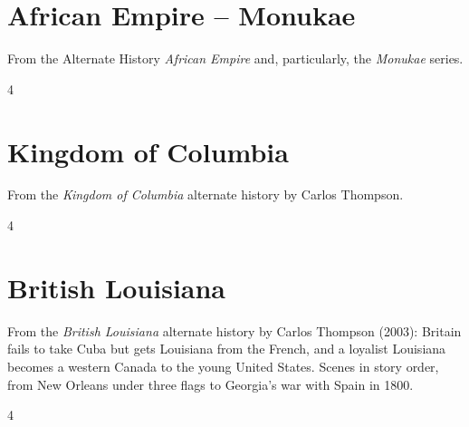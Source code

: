 \documentclass[a4paper,landscape]{memoir}
\begin{document}
\chapter{African Empire -- Monukae}
From the Alternate History \emph{African Empire} and, particularly, the \emph{Monukae} series.
\clearpage\begin{multicols*}{4}




















\end{multicols*}

\chapter{Kingdom of Columbia}
From the \emph{Kingdom of Columbia} alternate history by Carlos Thompson.
\clearpage\begin{multicols*}{4}







\end{multicols*}

\chapter{British Louisiana}
From the \emph{British Louisiana} alternate history by Carlos Thompson (2003): Britain fails to take Cuba but gets Louisiana from the French, and a loyalist Louisiana becomes a western Canada to the young United States. Scenes in story order, from New Orleans under three flags to Georgia's war with Spain in 1800.
\clearpage\begin{multicols*}{4}








\end{multicols*}
\end{document}
